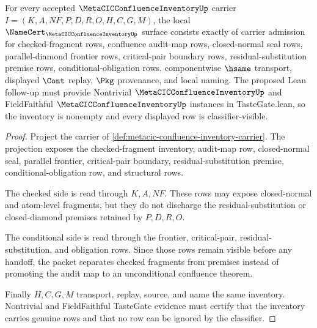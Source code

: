 \begin{theorem}\label{thm:metacic-confluence-inventory-namecert-obligations}
For every accepted $\MetaCICConfluenceInventoryUp$ carrier $I=(K,A,NF,P,D,R,O,H,C,G,M)$, the local $\NameCert_{\MetaCICConfluenceInventoryUp}$ surface consists exactly of carrier admission for checked-fragment rows, confluence audit-map rows, closed-normal seal rows, parallel-diamond frontier rows, critical-pair boundary rows, residual-substitution premise rows, conditional-obligation rows, componentwise $\hsame$ transport, displayed $\Cont$ replay, $\Pkg$ provenance, and local naming. The proposed Lean follow-up must provide Nontrivial $\MetaCICConfluenceInventoryUp$ and FieldFaithful $\MetaCICConfluenceInventoryUp$ instances in TasteGate.lean, so the inventory is nonempty and every displayed row is classifier-visible.
\end{theorem}
\begin{proof}
Project the carrier of \autoref{def:metacic-confluence-inventory-carrier}. The projection exposes the checked-fragment inventory, audit-map row, closed-normal seal, parallel frontier, critical-pair boundary, residual-substitution premise, conditional-obligation row, and structural rows.

The checked side is read through $K,A,NF$. These rows may expose closed-normal and atom-level fragments, but they do not discharge the residual-substitution or closed-diamond premises retained by $P,D,R,O$.

The conditional side is read through the frontier, critical-pair, residual-substitution, and obligation rows. Since those rows remain visible before any handoff, the packet separates checked fragments from premises instead of promoting the audit map to an unconditional confluence theorem.

Finally $H,C,G,M$ transport, replay, source, and name the same inventory. Nontrivial and FieldFaithful TasteGate evidence must certify that the inventory carries genuine rows and that no row can be ignored by the classifier.
\end{proof}

